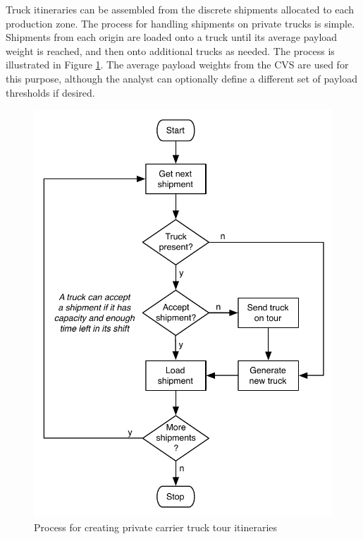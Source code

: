 Truck itineraries can be assembled from the discrete shipments allocated to each production zone. The process for handling shipments on private trucks is simple. Shipments from each origin are loaded onto a truck until its average payload weight is reached, and then onto additional trucks as needed. The process is illustrated in Figure \ref{fig:ct-private-tour-formation}. The average payload weights from the CVS are used for this purpose, although the analyst can optionally define a different set of payload thresholds if desired.

\begin{figure}[!t]
\centering
\includegraphics[scale=0.7]{figures/PrivateTrucks}
\caption{Process for creating private carrier truck tour itineraries}
\label{fig:ct-private-tour-formation}
\end{figure}

